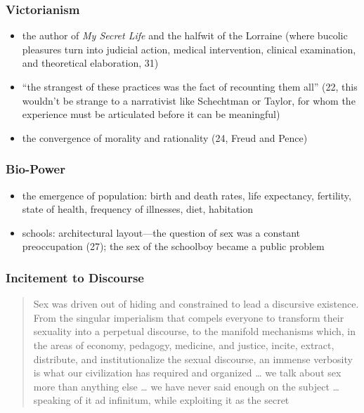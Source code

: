 \documentclass[xcolor=dvipsnames]{beamer}
\begin{document}
\begin{frame}
  \frametitle{Victorianism}
  \begin{itemize}
  \item the author of \emph{My Secret Life} and the halfwit of the
    Lorraine (where bucolic pleasures turn into judicial action,
    medical intervention, clinical examination, and theoretical
    elaboration, 31)
  \item ``the strangest of these practices was the fact of recounting
    them all'' (22, this wouldn't be strange to a narrativist like
    Schechtman or Taylor, for whom the experience must be articulated
    before it can be meaningful)
  \item the convergence of morality and rationality (24, Freud and Pence)
  \end{itemize}
\end{frame}

\begin{frame}
  \frametitle{Bio-Power}
  \begin{itemize}
  \item the emergence of population: birth and death rates, life
    expectancy, fertility, state of health, frequency of illnesses,
    diet, habitation
  \item schools: architectural layout---the question of sex was a
    constant preoccupation (27); the sex of the schoolboy became a
    public problem
  \end{itemize}
\end{frame}

\begin{frame}
  \frametitle{Incitement to Discourse}
  \begin{quote}
    Sex was driven out of hiding and constrained to lead a discursive
    existence. From the singular imperialism that compels everyone to
    transform their sexuality into a perpetual discourse, to the
    manifold mechanisms which, in the areas of economy, pedagogy,
    medicine, and justice, incite, extract, distribute, and
    institutionalize the sexual discourse, an immense verbosity is
    what our civilization has required and organized {\ldots} we talk
    about sex more than anything else {\ldots} we have never said
    enough on the subject {\ldots} speaking of it ad infinitum, while
    exploiting it as the secret
  \end{quote}
\end{frame}
\end{document}
